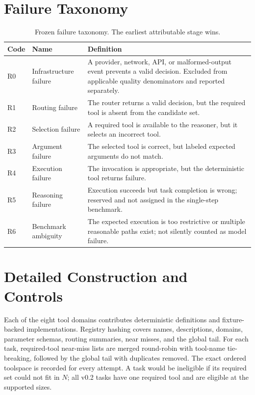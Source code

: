 \documentclass[10pt,twocolumn]{article}
\begin{document}



\appendix
\onecolumn
\section{Failure Taxonomy}

\begin{table}[h]
\centering
\caption{Frozen failure taxonomy. The earliest attributable stage wins.}
\begin{tabular}{p{}p{}p{}}
\toprule
Code & Name & Definition \\
\midrule
R0 & Infrastructure failure & A provider, network, API, or malformed-output event prevents a valid decision. Excluded from applicable quality denominators and reported separately. \\
R1 & Routing failure & The router returns a valid decision, but the required tool is absent from the candidate set. \\
R2 & Selection failure & A required tool is available to the reasoner, but it selects an incorrect tool. \\
R3 & Argument failure & The selected tool is correct, but labeled expected arguments do not match. \\
R4 & Execution failure & The invocation is appropriate, but the deterministic tool returns failure. \\
R5 & Reasoning failure & Execution succeeds but task completion is wrong; reserved and not assigned in the single-step benchmark. \\
R6 & Benchmark ambiguity & The expected execution is too restrictive or multiple reasonable paths exist; not silently counted as model failure. \\
\bottomrule
\end{tabular}
\end{table}

\section{Detailed Construction and Controls}

Each of the eight tool domains contributes deterministic definitions and fixture-backed implementations. Registry hashing covers names, descriptions, domains, parameter schemas, routing summaries, near misses, and the global tail. For each task, required-tool near-miss lists are merged round-robin with tool-name tie-breaking, followed by the global tail with duplicates removed. The exact ordered toolspace is recorded for every attempt. A task would be ineligible if its required set could not fit in $N$; all v0.2 tasks have one required tool and are eligible at the supported sizes.
\end{document}
